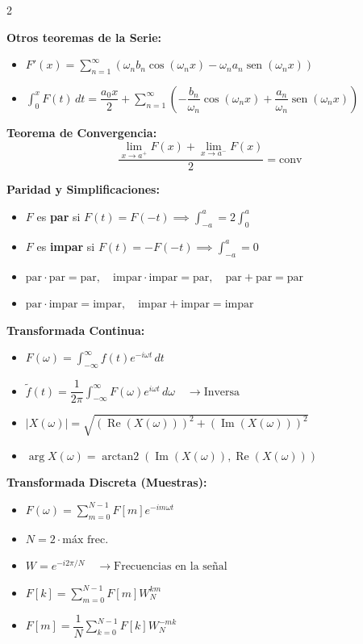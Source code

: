 \documentclass[10pt]{extarticle}
\newenvironment{term}
  {\begin{minipage}{\linewidth}}
  {\end{minipage}\par}
\begin{document}
\begin{multicols}{2}
\begin{term}
\textbf{Otros teoremas de la Serie:}
\begin{itemize}[leftmargin=1.2em]
\item $F'(x) = \sum_{n=1}^{\infty} \left( \omega_n b_n \cos(\omega_n x) - \omega_n a_n \operatorname{sen}(\omega_n x) \right)$
\item $\int_{0}^{x} F(t) \, dt = \dfrac{a_0 x}{2} + \sum_{n=1}^{\infty} \left( -\dfrac{b_n}{\omega_n} \cos(\omega_n x) + \dfrac{a_n}{\omega_n} \operatorname{sen}(\omega_n x) \right)$
\end{itemize}

\textbf{Teorema de Convergencia:}
$$\frac{\lim_{x \to a^+} F(x) + \lim_{x \to a^-} F(x)}{2} = \text{conv}$$

\textbf{Paridad y Simplificaciones:}
\begin{itemize}[leftmargin=1.2em]
\item $F$ es \textbf{par} si $F(t) = F(-t) \implies \int_{-a}^{a} = 2 \int_{0}^{a}$
\item $F$ es \textbf{impar} si $F(t) = -F(-t) \implies \int_{-a}^{a} = 0$
\item $\text{par} \cdot \text{par} = \text{par}, \quad \text{impar} \cdot \text{impar} = \text{par}, \quad \text{par} + \text{par} = \text{par}$
\item $\text{par} \cdot \text{impar} = \text{impar}, \quad \text{impar} + \text{impar} = \text{impar}$
\end{itemize}
\end{term}

\begin{term}
\textbf{Transformada Continua:}
\begin{itemize}[leftmargin=1.2em]
\item $F(\omega) = \int_{-\infty}^{\infty} f(t) e^{-i\omega t} \, dt$
\item $\tilde{f}(t) = \dfrac{1}{2\pi} \int_{-\infty}^{\infty} F(\omega) e^{i\omega t} \, d\omega \quad \longrightarrow \text{Inversa}$
\item $|X(\omega)| = \sqrt{(\operatorname{Re}(X(\omega)))^2 + (\operatorname{Im}(X(\omega)))^2}$
\item $\operatorname{arg} X(\omega) = \operatorname{arctan2}(\operatorname{Im}(X(\omega)), \operatorname{Re}(X(\omega)))$
\end{itemize}

\textbf{Transformada Discreta (Muestras):}
\begin{itemize}[leftmargin=1.2em]
\item $F(\omega) = \sum_{m=0}^{N-1} F[m] e^{-i m \omega t}$
\item $N = 2 \cdot \text{máx frec.}$
\item $W = e^{-i 2\pi / N} \quad \longrightarrow \text{Frecuencias en la señal}$
\item $F[k] = \sum_{m=0}^{N-1} F[m] W_N^{km}$
\item $F[m] = \dfrac{1}{N} \sum_{k=0}^{N-1} F[k] W_N^{-mk}$
\end{itemize}
\end{term}



\end{multicols}
\end{document}
